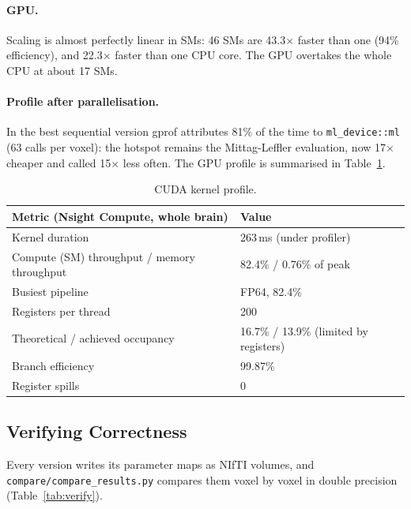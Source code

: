 \documentclass[11pt]{article}
\begin{document}
\paragraph{GPU.} Scaling is almost perfectly linear in SMs: 46 SMs are 43.3$\times$ faster than
one (94\% efficiency), and 22.3$\times$ faster than one CPU core. The GPU overtakes the whole
CPU at about 17 SMs.

\paragraph{Profile after parallelisation.} In the best sequential version gprof attributes 81\%
of the time to \texttt{ml\_device::ml} (63 calls per voxel): the hotspot remains the
Mittag-Leffler evaluation, now 17$\times$ cheaper and called 15$\times$ less often. The GPU
profile is summarised in Table~\ref{tab:ncu}.

\begin{table}[htbp]
\centering
\begin{tabular}{ll}
\toprule
Metric (Nsight Compute, whole brain) & Value \\
\midrule
Kernel duration & 263\,ms (under profiler) \\
Compute (SM) throughput / memory throughput & 82.4\% / 0.76\% of peak \\
Busiest pipeline & FP64, 82.4\% \\
Registers per thread & 200 \\
Theoretical / achieved occupancy & 16.7\% / 13.9\% (limited by registers) \\
Branch efficiency & 99.87\% \\
Register spills & 0 \\
\bottomrule
\end{tabular}
\caption{CUDA kernel profile.}
\label{tab:ncu}
\end{table}

\subsection{Verifying Correctness}
\label{sec:verify}

Every version writes its parameter maps as NIfTI volumes, and \texttt{compare/compare\_results.py}
compares them voxel by voxel in double precision (Table~\ref{tab:verify}).
\end{document}
